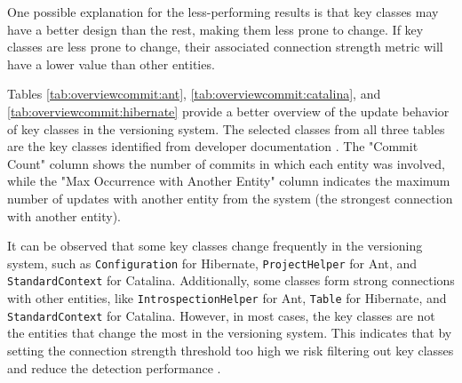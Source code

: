 \begin{table}[!h]
\setlength\tabcolsep{3.5pt}
\caption{Measurements for Hibernate using only logical dependencies}
\label{tab:measurementshistory:hibernate}
\centering
{}
\end{table}



One possible explanation for the less-performing results is that key classes may have a better design than the rest, making them less prone to change. If key classes are less prone to change, their associated connection strength metric will have a lower value than other entities.

Tables \ref{tab:overviewcommit:ant}, \ref{tab:overviewcommit:catalina}, and \ref{tab:overviewcommit:hibernate} provide a better overview of the update behavior of key classes in the versioning system. The selected classes from all three tables are the key classes identified from developer documentation \cite{Finding-key-classes}. The "Commit Count" column shows the number of commits in which each entity was involved, while the "Max Occurrence with Another Entity" column indicates the maximum number of updates with another entity from the system (the strongest connection with another entity).

It can be observed that some key classes change frequently in the versioning system, such as \texttt{Configuration} for Hibernate, \texttt{ProjectHelper} for Ant, and \texttt{StandardContext} for Catalina. Additionally, some classes form strong connections with other entities, like \texttt{IntrospectionHelper} for Ant, \texttt{Table} for Hibernate, and \texttt{StandardContext} for Catalina. However, in most cases, the key classes are not the entities that change the most in the versioning system. This indicates that by setting the connection strength threshold too high we risk filtering out key classes and reduce the detection performance \cite{b4}.


